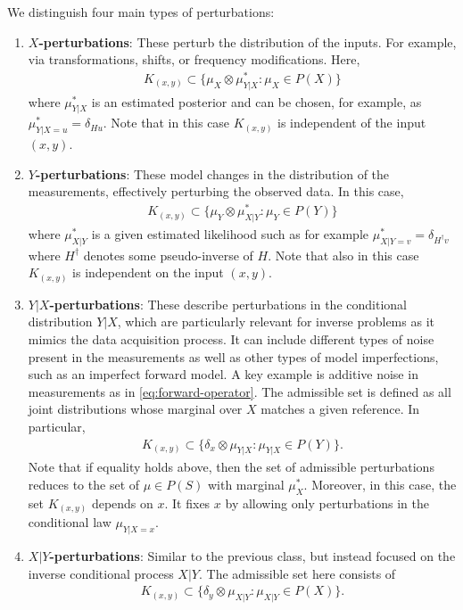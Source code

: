 \documentclass{article}
\theoremstyle{definition}
\theoremstyle{remarksty}
\begin{document}
We distinguish four main types of perturbations:
\begin{enumerate}
    \item \textbf{$X$-perturbations}: These perturb the distribution of the inputs. For example, via transformations, shifts, or frequency modifications. Here, 
    \begin{align*}
        K_{(x,y)} \subset \{\mu_X \otimes \mu^*_{Y|X} : \mu_X \in P(X)\}
    \end{align*}
    where $\mu^*_{Y|X}$ is an estimated posterior and can be chosen, for example, as $\mu^*_{Y|X=u}= \delta_{Hu}$. Note that in this case $K_{(x,y)}$ is independent of the input $(x,y)$.
    \item \textbf{$Y$-perturbations}: These model changes in the distribution of the measurements, effectively perturbing the observed data. In this case, 
    \begin{align*}
        K_{(x,y)} \subset \{ \mu_Y \otimes \mu^*_{X|Y}  : \mu_Y \in P(Y)\}
    \end{align*}
    where $\mu^*_{X|Y}$ is a given estimated likelihood such as for example $\mu^*_{X|Y=v} = \delta_{H^\dagger v}$ where $H^\dagger$ denotes some pseudo-inverse of $H$. Note that also in this case $K_{(x,y)}$ is independent on the input $(x,y)$.
    \item \textbf{$Y|X$-perturbations}: These describe perturbations in the conditional distribution $Y|X$, which are particularly relevant for inverse problems as it mimics the data acquisition process. It can include different types of noise present in the measurements as well as other types of model imperfections, such as an imperfect forward model. A key example is additive noise in measurements as in \eqref{eq:forward-operator}. 
    The admissible set is defined as all joint distributions whose marginal over $X$ matches a given reference. 
    In particular,
    \begin{align*}
        K_{(x,y)} \subset \{ \delta_x \otimes \mu_{Y|X} :  \mu_{Y|X} \in P(Y)\}.
    \end{align*}
    Note that if equality holds above, then the set of admissible perturbations reduces to the set of $\mu \in P(S)$ with marginal $\mu_X^*$. Moreover, in this case, the set $K_{(x,y)}$ depends on $x$. It fixes $x$ by allowing only perturbations in the conditional law $\mu_{Y|X=x}$.
    \item \textbf{$X|Y$-perturbations}: Similar to the previous class, but instead focused on the inverse conditional process $X|Y$. The admissible set here consists of
    \begin{align*}
        K_{(x,y)} \subset \{ \delta_y \otimes \mu_{X|Y} : \mu_{X|Y}\in P(X) \}.
    \end{align*}
\end{enumerate}
\end{document}
